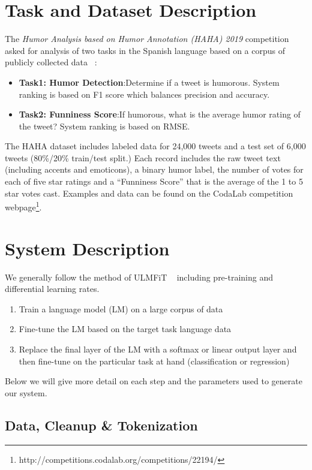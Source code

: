 \documentclass[runningheads]{llncs}
\begin{document}
\section{Task and Dataset Description}
\label{sec:task}
The \textit{Humor Analysis based on Humor Annotation (HAHA) 2019}\cite{overview_haha2019} competition asked for analysis of two tasks in the Spanish language based on a corpus of publicly collected data ~\cite{castro2018crowd}:
\begin{itemize}
\item \textbf{Task1: Humor Detection}:Determine if a tweet is humorous. System ranking is based on F1 score which balances precision and accuracy.
\item \textbf{Task2: Funniness Score}:If humorous, what is the average humor rating of the tweet? System ranking is based on RMSE.
\end{itemize}
The HAHA dataset includes labeled data for 24,000 tweets and a test set of 6,000 tweets (80\%/20\% train/test split.)  Each record includes the raw tweet text (including accents and emoticons), a binary humor label, the number of votes for each of five star ratings and a ``Funniness Score'' that is the average of the 1 to 5 star votes cast.  Examples and data can be found on the CodaLab competition webpage\footnote{http://competitions.codalab.org/competitions/22194/}.

\section{System Description}
\label{sec:system}
We generally follow the method of ULMFiT ~\cite{HowardRuder:DBLP:journals/corr/abs-1801-06146} including pre-training and differential learning rates. 
\begin{enumerate}
	\item Train a language model (LM) on a large corpus of data
	\item Fine-tune the LM based on the target task language data
	\item Replace the final layer of the LM with a softmax or linear output layer and then fine-tune on the particular task at hand (classification or regression)
\end{enumerate}
Below we will give more detail on each step and the parameters used to generate our system.
\subsection{Data, Cleanup \& Tokenization}
\label{sec:datacleaning}
\end{document}
